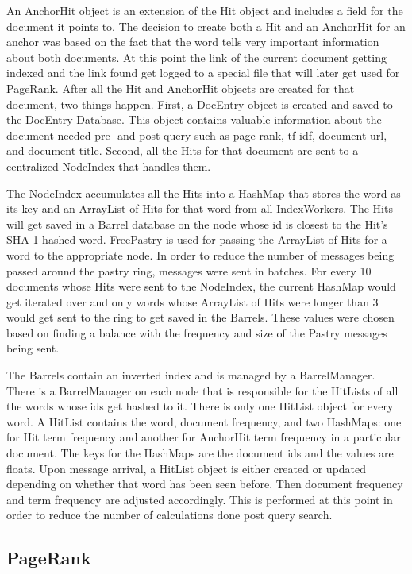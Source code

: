 \documentclass[11pt, letterpaper, oneside, twocolumn]{article}
\begin{document}
An AnchorHit object is an extension of the Hit object and includes a field for the document it points to. 
The decision to create both a Hit and an AnchorHit for an anchor was based on the fact that the word tells very important information about both documents. 
At this point the link of the current document getting indexed and the link found get logged to a special file that will later get used for PageRank. 
After all the Hit and AnchorHit objects are created for that document, two things happen. 
First, a DocEntry object is created and saved to the DocEntry Database. 
This object contains valuable information about the document needed pre- and post-query such as page rank, tf-idf, document url, and document title. 
Second, all the Hits for that document are sent to a centralized NodeIndex that handles them.

The NodeIndex accumulates all the Hits into a HashMap that stores the word as its key and an ArrayList of Hits for that word from all IndexWorkers. 
The Hits will get saved in a Barrel database on the node whose id is closest to the Hit's SHA-1 hashed word. 
FreePastry is used for passing the ArrayList of Hits for a word to the appropriate node. 
In order to reduce the number of messages being passed around the pastry ring, messages were sent in batches. 
For every 10 documents whose Hits were sent to the NodeIndex, the current HashMap would get iterated over and only words whose ArrayList of Hits were longer than 3 would get sent to the ring to get saved in the Barrels. 
These values were chosen based on finding a balance with the frequency and size of the Pastry messages being sent. 


The Barrels contain an inverted index and is managed by a BarrelManager. 
There is a BarrelManager on each node that is responsible for the HitLists of all the words whose ids get hashed to it. There is only one HitList object for every word. 
A HitList contains the word, document frequency, and two HashMaps: one for Hit term frequency and another for AnchorHit term frequency in a particular document. 
The keys for the HashMaps are the document ids and the values are floats. 
Upon message arrival, a HitList object is either created or updated depending on whether that word has been seen before. 
Then document frequency and term frequency are adjusted accordingly. 
This is performed at this point in order to reduce the number of calculations done post query search.  

\subsection{PageRank}
\end{document}
